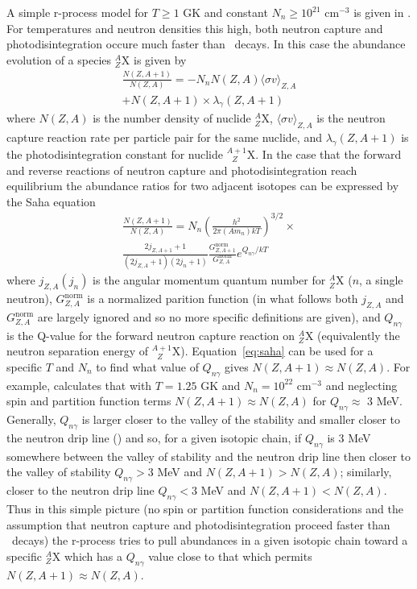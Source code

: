 A simple r-process model for $T\geq 1$ GK and constant $N_n \geq 10^{21}$
cm$^{-3}$ is given in \cite{iliadis2008}.  For temperatures and
neutron densities this high, both neutron capture and
photodisintegration occure much faster than \bminus\ decays.  In this
case the abundance evolution of a species $^A_Z$X is given by
\begin{multline}
\frac{N(Z,A+1)}{N(Z,A)} = - N_nN(Z,A) \langle \sigma v \rangle_{Z,A} \\
+N(Z,A+1)\times\lambda_\gamma (Z,A+1)
\end{multline}
where $N(Z,A)$ is the number density of  nuclide $^A_Z$X, $\langle 
\sigma v \rangle_{Z,A}$ is the neutron
capture reaction rate per particle pair for the same nuclide, and
$\lambda_\gamma (Z,A+1)$ is the photodisintegration constant for
nuclide  $^{A+1}_{\ \ \ Z}$X. 
In the case that the forward and reverse
reactions of neutron capture and photodisintegration reach equilibrium
the abundance ratios for two adjacent isotopes can be expressed by the
Saha equation
\begin{multline}
\label{eq:saha}
\frac{N(Z,A+1)}{N(Z,A)} =N_n\left(\frac{h^2}{2\pi
(Am_{n})kT}\right)^{3/2} \times \\
\frac{2j_{Z,A+1}+1}{(2j_{Z,A}+1)(2j_{n}+1)}
\frac{G^{\textrm{norm}}_{Z,A+1}}{G^{\textrm{norm}}_{Z,A}}e^{Q_{n\gamma}/kT}
\end{multline}
where $j_{Z,A} (j_n)$ is the angular momentum quantum number for
$^{A}_{Z}$X ($n$, a single neutron), $G^{\textrm{norm}}_{Z,A}$ is a normalized parition
function (in what follows both $j_{Z,A}$ and
$G^{\textrm{norm}}_{Z,A}$ are largely ignored and so no more specific
definitions are given), and $Q_{n\gamma}$ is the Q-value for the forward 
neutron capture
reaction on $^{A}_{Z}$X (equivalently the neutron separation energy of
$^{A+1}_{\ \ \ Z}$X). Equation~\ref{eq:saha} can be used 
for a specific $T$ and $N_n$ to find what value of 
$Q_{n\gamma}$  gives $N(Z,A+1) \approx N(Z,A)$.
For example, \cite{iliadis2008} calculates that with $T=1.25$ GK and 
$N_n=10^{22}$ cm$^{-3}$ and neglecting spin and partition function terms
$N(Z,A+1) \approx N(Z,A)$ for $Q_{n\gamma}\approx$ 3 MeV.  Generally,
$Q_{n\gamma}$ is larger closer to the valley of the stability and
smaller closer to the neutron drip line (\citealt{iliadis2008}) and
so, for a given isotopic chain, if $Q_{n\gamma}$ is 3 MeV somewhere
between the valley of stability and the neutron drip line then closer
to the valley of stability $Q_{n\gamma}> 3$  MeV and $N(Z,A+1) >
N(Z,A)$; similarly, closer to the neutron drip line $Q_{n\gamma}< 3$
MeV and $N(Z,A+1) < N(Z,A)$.  Thus in this simple picture (no spin or
partition function considerations and the assumption  that neutron capture and
photodisintegration proceed faster than \bminus\ decays)
the r-process  tries to pull abundances in a
given isotopic chain toward a specific $^A_Z$X which has a
$Q_{n\gamma}$ value close to that which permits $N(Z,A+1) \approx N(Z,A)$. 

